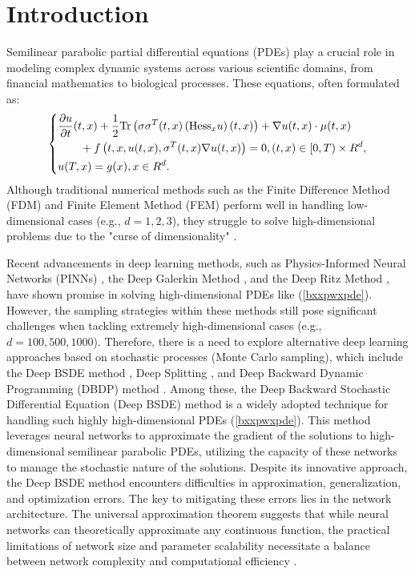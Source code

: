 \documentclass[11pt]{article}
\begin{document}
\section{Introduction}
Semilinear parabolic partial differential equations (PDEs) play a crucial role in modeling complex dynamic systems across various scientific domains, from financial mathematics to biological processes. These equations, often formulated as:
\begin{equation}\label{bxxpwxpde}
	\left\{ \begin{aligned}
		& \frac{{\partial u}}{{\partial t}}(t,x)  + \frac{1}{2}{\mathop{\rm Tr}\nolimits} \left( {\sigma {\sigma ^{{T}}}(t,x)\left( {{{{\mathop{\rm Hess}\nolimits} }_x}u} \right)(t,x)} \right) + \nabla u(t,x) \cdot \mu (t,x)  \\
		&\qquad  + f\left( {t,x,u(t,x),{\sigma ^{{T}}}(t,x)\nabla u(t,x)} \right) = 0,(t,x) \in [0,T) \times {R^d},\\
		& u(T,x) = g(x),x \in {R^d}.
	\end{aligned} \right.
\end{equation}
Although traditional numerical methods such as the Finite Difference Method (FDM) and Finite Element Method (FEM) perform well in handling low-dimensional cases (e.g., $d=1, 2, 3$), they struggle to solve high-dimensional problems due to the "curse of dimensionality" \textsuperscript{\cite{weishu1}}.

Recent advancements in deep learning methods, such as Physics-Informed Neural Networks (PINNs) \textsuperscript{\cite{PINN,Shin,Mishra,PINN_2024_1,PINN_2024_2}}, the Deep Galerkin Method \textsuperscript{\cite{DGM, DGM_2024}}, and the Deep Ritz Method \textsuperscript{\cite{Ritz,Ritz_2024}}, have shown promise in solving high-dimensional PDEs like (\ref{bxxpwxpde}). However, the sampling strategies within these methods still pose significant challenges when tackling extremely high-dimensional cases (e.g., $d=100, 500, 1000$).
Therefore, there is a need to explore alternative deep learning approaches based on stochastic processes (Monte Carlo sampling), which include the Deep BSDE method \textsuperscript{\cite{E2017}}, Deep Splitting \textsuperscript{\cite{Beck2}}, and Deep Backward Dynamic Programming (DBDP) method \textsuperscript{\cite{DBDP}}. 
Among these, the Deep Backward Stochastic Differential Equation (Deep BSDE) method is a widely adopted technique for handling such highly high-dimensional PDEs (\ref{bxxpwxpde}).
This method leverages neural networks to approximate the gradient of the solutions to high-dimensional semilinear parabolic PDEs, utilizing the capacity of these networks to manage the stochastic nature of the solutions.
Despite its innovative approach, the Deep BSDE method encounters difficulties in approximation, generalization, and optimization errors. The key to mitigating these errors lies in the network architecture. The universal approximation theorem suggests that while neural networks can theoretically approximate any continuous function, the practical limitations of network size and parameter scalability necessitate a balance between network complexity and computational efficiency \textsuperscript{\cite{weishu}}.
\end{document}
